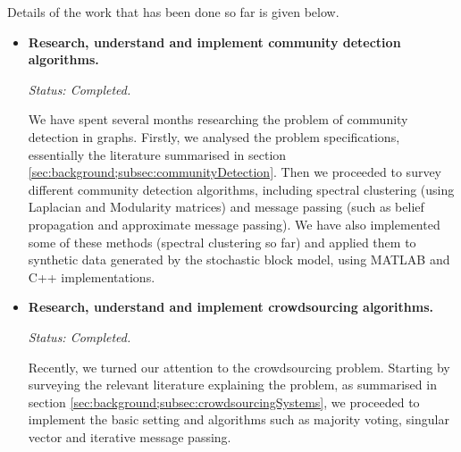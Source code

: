 \documentclass[12pt]{article}
\numberwithin{equation}{section}
\begin{document}
Details of the work that has been done so far is given below.
\begin{itemize}
	\item \textbf{Research, understand and implement community detection algorithms.}

	\textit{Status: Completed.}	

	We have spent several months researching the problem of community detection in graphs. Firstly, we analysed the problem specifications, essentially the literature summarised in section \ref{sec:background;subsec:communityDetection}. Then we proceeded to survey different community detection algorithms, including spectral clustering (using Laplacian and Modularity matrices) and message passing (such as belief propagation and approximate message passing). We have also implemented some of these methods (spectral clustering so far) and applied them to synthetic data generated by the stochastic block model, using MATLAB and C++ implementations.

	\item \textbf{Research, understand and implement crowdsourcing algorithms.}

	\textit{Status: Completed.}

	Recently, we turned our attention to the crowdsourcing problem. Starting by surveying the relevant literature explaining the problem, as summarised in section \ref{sec:background;subsec:crowdsourcingSystems}, we proceeded to implement the basic setting and algorithms such as majority voting, singular vector and iterative message passing.
\end{itemize}
\end{document}
